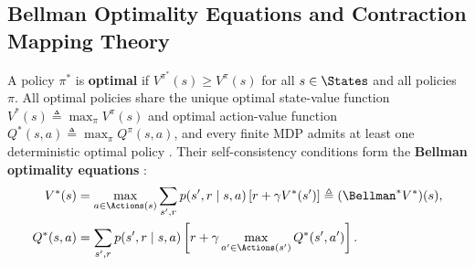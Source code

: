 \documentclass[../../../../master.tex]{subfiles}
\begin{document}
\subsection{Bellman Optimality Equations and Contraction Mapping Theory}
A policy $\pi^*$ is \textbf{optimal} if $V^{\pi^*}(s) \ge V^\pi(s)$ for all $s \in \States$ and all policies $\pi$. All optimal policies share the unique optimal state-value function $V^*(s) \triangleq \max_\pi V^\pi(s)$ and optimal action-value function $Q^*(s, a) \triangleq \max_\pi Q^\pi(s, a)$, and every finite MDP admits at least one deterministic optimal policy . Their self-consistency conditions form the \textbf{Bellman optimality equations} :
\begin{align}
  V^*(s) &= \max_{a \in \Actions(s)} \sum_{s', r} p(s', r \mid s, a)\left[r + \gamma V^*(s')\right] \triangleq (\Bellman^* V^*)(s), \label{eq:mdp:bellman_opt_v} \\
  Q^*(s, a) &= \sum_{s', r} p(s', r \mid s, a)\left[r + \gamma \max_{a' \in \Actions(s')} Q^*(s', a')\right]. \label{eq:mdp:bellman_opt_q}
\end{align}
\end{document}
